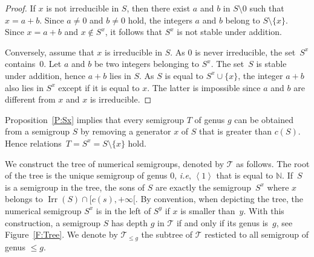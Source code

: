 \documentclass[reqno,11pt]{amsart}
\theoremstyle{plain}
\theoremstyle{definition}
\newcommand{\ie}{\emph{i.e.}}
\renewcommand{\leq}{\leqslant}
\newcommand{\NN}{\mathbb{N}}
\renewcommand{\ie}{\emph{i.e}}
\DeclareMathOperator{\Irr}{Irr}
\begin{document}
\begin{proof}
If $x$ is not irreducible in  $S$, then there exist $a$ and $b$ in $S\setminus{0}$ such that $x=a+b$. 
Since $a\not=0$ and $b\not=0$ hold, the integers  $a$ and $b$ belong to $S\setminus\{x\}$. 
Since $x=a+b$ and $x\not\in S^x$, it follows that  $S^x$ is not stable under addition. 

Conversely, assume that $x$ is irreducible in  $S$. 
As $0$ is never irreducible, the set~$S^x$ contains~$0$. 
Let $a$ and $b$ be two integers belonging to $S^x$. 
The set~$S$ is stable under addition, hence $a+b$ lies in $S$. 
As $S$ is equal to $S^x\cup\{x\}$, the integer $a+b$ also lies in $S^x$ except if it is equal to $x$. 
The latter is impossible since $a$ and $b$ are different from $x$ and $x$ is irreducible.
\end{proof}

Proposition~\ref{P:Sx} implies that every semigroup $T$ of genus $g$ can be obtained from a semigroup $S$ by removing a generator $x$ of $S$ that is greater than $c(S)$.
Hence relations~$T=S^x=S\setminus\{x\}$ hold.

We construct the tree of numerical semigroups, denoted by $\mathcal{T}$ as follows. 
The root of the tree is the unique semigroup of genus $0$, \ie, $\left<1\right>$ that is equal to $\NN$. 
If~$S$ is a semigroup in the tree,  the sons of $S$ are exactly the semigroup~$S^x$ where $x$ belongs to $\Irr(S)\cap[c(s),+\infty[$. 
By convention, when depicting the tree, the numerical semigroup $S^x$ is in the left of $S^y$ if $x$ is smaller than~$y$. 
With this construction, a semigroup $S$ has depth $g$ in $\mathcal{T}$ if and only if its genus is~$g$, see Figure~\ref{F:Tree}.
We denote by $\mathcal{T}_{\leq g}$ the subtree of $\mathcal{T}$ resticted to all semigroup of genus $\leq g$.
\end{document}
